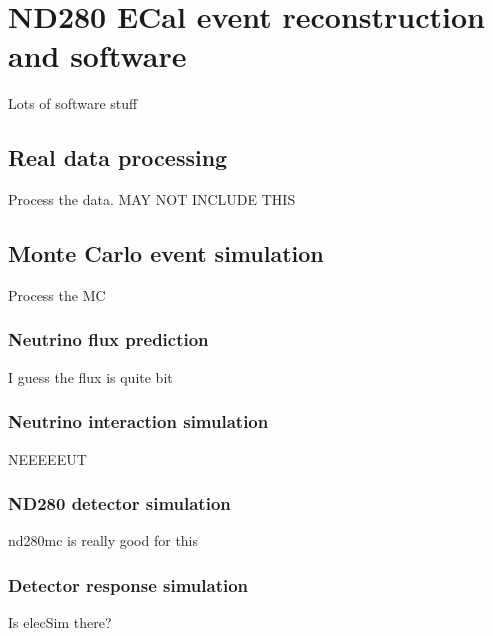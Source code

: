 


\chapter{ND280 ECal event reconstruction and software}
\label{chap:ND280Software}
Lots of software stuff

\section{Real data processing}
\label{sec:datachain}
Process the data.  MAY NOT INCLUDE THIS

\section{Monte Carlo event simulation}
\label{sec:MCchain}
Process the MC

\subsection{Neutrino flux prediction}
\label{subsec:NeutrinoFluxPrediction}
I guess the flux is quite bit

\subsection{Neutrino interaction simulation}
\label{subsec:NeutrinoInteractionSimulation}
NEEEEEUT

\subsection{ND280 detector simulation}
\label{subsec:ND280DetectorSimulation}
nd280mc is really good for this

\subsection{Detector response simulation}
\label{subsec:DetectorResponseSimulation}
Is elecSim there?

